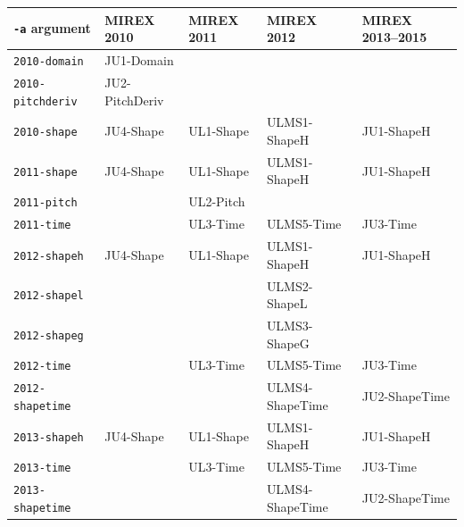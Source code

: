 \documentclass[twoside]{article}
\begin{document}
\begin{table}[!h]\setlength{\tabcolsep}{4pt}
\small\centering\begin{tabular}{l|llll}
	\hline
	\texttt{-a} argument     & MIREX 2010              & MIREX 2011         & MIREX 2012               & MIREX 2013--2015             \\ \hline
	\texttt{2010-domain}     & \textsf{JU1-Domain}     &                    &                          &                        \\
	\texttt{2010-pitchderiv} & \textsf{JU2-PitchDeriv} &                    &                          &                        \\
	\texttt{2010-shape}      & \textsf{JU4-Shape}      & \textsf{UL1-Shape} & \textsf{ULMS1-ShapeH}    & \textsf{JU1-ShapeH}    \\ \hline
	\texttt{2011-shape}      & \textsf{JU4-Shape}      & \textsf{UL1-Shape} & \textsf{ULMS1-ShapeH}    & \textsf{JU1-ShapeH}    \\
	\texttt{2011-pitch}      &                         & \textsf{UL2-Pitch} &                          &                        \\
	\texttt{2011-time}       &                         & \textsf{UL3-Time}  & \textsf{ULMS5-Time}      & \textsf{JU3-Time}      \\ \hline
	\texttt{2012-shapeh}     & \textsf{JU4-Shape}      & \textsf{UL1-Shape} & \textsf{ULMS1-ShapeH}    & \textsf{JU1-ShapeH}    \\
	\texttt{2012-shapel}     &                         &                    & \textsf{ULMS2-ShapeL}    &                        \\
	\texttt{2012-shapeg}     &                         &                    & \textsf{ULMS3-ShapeG}    &                        \\
	\texttt{2012-time}       &                         & \textsf{UL3-Time}  & \textsf{ULMS5-Time}      & \textsf{JU3-Time}      \\
	\texttt{2012-shapetime}  &                         &                    & \textsf{ULMS4-ShapeTime} & \textsf{JU2-ShapeTime} \\ \hline
	\texttt{2013-shapeh}     & \textsf{JU4-Shape}      & \textsf{UL1-Shape} & \textsf{ULMS1-ShapeH}    & \textsf{JU1-ShapeH}    \\
	\texttt{2013-time}       &                         & \textsf{UL3-Time}  & \textsf{ULMS5-Time}      & \textsf{JU3-Time}      \\
	\texttt{2013-shapetime}  &                         &                    & \textsf{ULMS4-ShapeTime} & \textsf{JU2-ShapeTime} \\ \hline

\end{tabular}
\end{table}
\end{document}
